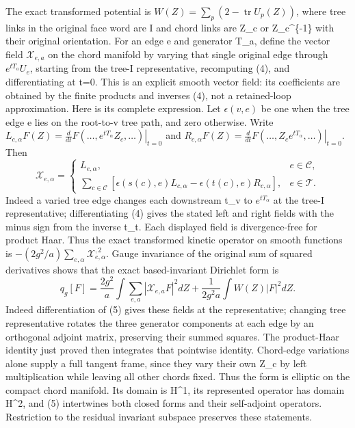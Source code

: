 \documentclass[
  11pt,
]{article}
\begin{document}
The exact transformed potential is
\(W(Z)=\sum_p(2-\operatorname{tr}U_p(Z))\), where tree links in the
original face word are I and chord links are Z\_c or Z\_c\^{}\{-1\} with
their original orientation. For an edge e and generator T\_a, define the
vector field \(\mathcal X_{e,a}\) on the chord manifold by varying that
single original edge through \(e^{tT_a}U_e\), starting from the tree-I
representative, recomputing (4), and differentiating at t=0. This is an
explicit smooth vector field: its coefficients are obtained by the
finite products and inverses (4), not a retained-loop approximation.
Here is its complete expression. Let \(\epsilon(v,e)\) be one when the
tree edge e lies on the root-to-v tree path, and zero otherwise. Write
\(L_{c,\alpha}F(Z)=\left.\frac d{dt}F(\ldots,e^{tT_\alpha}Z_c,\ldots)
\right|_{t=0}\) and
\(R_{c,\alpha}F(Z)=\left.\frac d{dt}F(\ldots,Z_ce^{tT_\alpha},\ldots)
\right|_{t=0}\). Then \[
 \mathcal X_{e,\alpha}=
 \begin{cases}
 L_{e,\alpha},&e\in\mathcal C,\\
 \displaystyle\sum_{c\in\mathcal C}
 [\epsilon(s(c),e)L_{c,\alpha}-\epsilon(t(c),e)R_{c,\alpha}],
       &e\in\mathcal T.
 \end{cases}
\tag{5a}
\] Indeed a varied tree edge changes each downstream t\_v to
\(e^{tT_\alpha}\) at the tree-I representative; differentiating (4)
gives the stated left and right fields with the minus sign from the
inverse t\_t. Each displayed field is divergence-free for product Haar.
Thus the exact transformed kinetic operator on smooth functions is
\(-(2g^2/a)\sum_{e,\alpha}\mathcal X_{e,\alpha}^{,2}\). Gauge invariance
of the original sum of squared derivatives shows that the exact
based-invariant Dirichlet form is \[
 q_g[F]=\frac{2g^2}{a}\int\sum_{e,a}|\mathcal X_{e,a}F|^2dZ
                   +\frac1{2g^2a}\int W(Z)|F|^2dZ.
\tag{6}
\] Indeed differentiation of (5) gives these fields at the
representative; changing tree representative rotates the three generator
components at each edge by an orthogonal adjoint matrix, preserving
their summed squares. The product-Haar identity just proved then
integrates that pointwise identity. Chord-edge variations alone supply a
full tangent frame, since they vary their own Z\_c by left
multiplication while leaving all other chords fixed. Thus the form is
elliptic on the compact chord manifold. Its domain is H\^{}1, its
represented operator has domain H\^{}2, and (5) intertwines both closed
forms and their self-adjoint operators. Restriction to the residual
invariant subspace preserves these statements.
\end{document}
